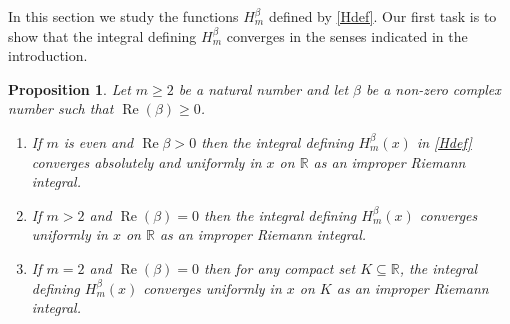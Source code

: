 \documentclass{article}
\theoremstyle{theorem}
\newtheorem{proposition}[theorem]{Proposition}
\theoremstyle{remark}
\renewcommand\Re{\operatorname{Re}}%
\begin{document}
In this section we study the functions $H_m^{\beta}$ defined by \eqref{Hdef}. Our first task is to show that the integral defining $H_m^{\beta}$ converges in the senses indicated in the introduction.


\begin{proposition}\label{Hconverge} Let $m\geq 2$ be a natural number and let $\beta$ be a non-zero complex number such that $\Re(\beta)\geq 0$.
\begin{enumerate}
\item If $m$ is even and $\Re{\beta}>0$ then the integral defining $H_m^{\beta}(x)$ in \eqref{Hdef} converges absolutely and uniformly in $x$ on $\mathbb{R}$ as an improper Riemann integral.
\item If $m>2$ and $\Re(\beta)=0$ then the integral defining $H_m^{\beta}(x)$ converges uniformly in $x$ on $\mathbb{R}$ as an improper Riemann integral.
\item If $m=2$ and $\Re(\beta)=0$ then for any compact set $K\subseteq\mathbb{R}$, the integral defining $H_m^{\beta}(x)$ converges uniformly in $x$ on $K$ as an improper Riemann integral.
\end{enumerate}
\end{proposition}
\end{document}
